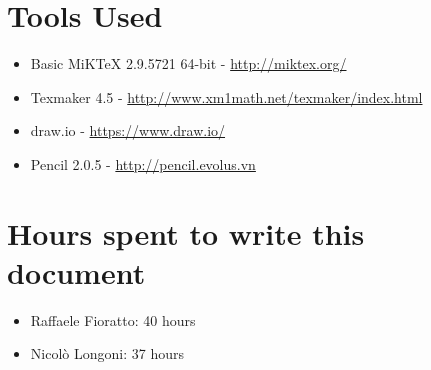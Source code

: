 \newpage
\section*{Tools Used}
\begin{itemize}
\item Basic MiKTeX 2.9.5721 64-bit - \url{http://miktex.org/}
\item Texmaker 4.5 - \url{http://www.xm1math.net/texmaker/index.html}
\item draw.io - \url{https://www.draw.io/}
\item Pencil 2.0.5 - \url{http://pencil.evolus.vn}
\end{itemize}
\section*{Hours spent to write this document}
\begin{itemize}
\item Raffaele Fioratto: 40 hours
\item Nicol\`{o} Longoni: 37 hours
\end{itemize}
